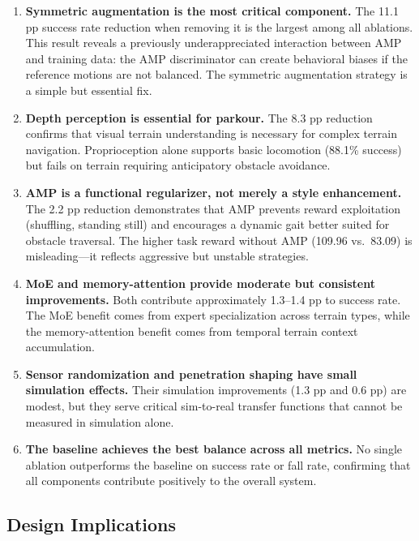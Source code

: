 \begin{enumerate}
    \item \textbf{Symmetric augmentation is the most critical component.} The 11.1 pp success rate reduction when removing it is the largest among all ablations. This result reveals a previously underappreciated interaction between AMP and training data: the AMP discriminator can create behavioral biases if the reference motions are not balanced. The symmetric augmentation strategy is a simple but essential fix.

    \item \textbf{Depth perception is essential for parkour.} The 8.3 pp reduction confirms that visual terrain understanding is necessary for complex terrain navigation. Proprioception alone supports basic locomotion (88.1\% success) but fails on terrain requiring anticipatory obstacle avoidance.

    \item \textbf{AMP is a functional regularizer, not merely a style enhancement.} The 2.2 pp reduction demonstrates that AMP prevents reward exploitation (shuffling, standing still) and encourages a dynamic gait better suited for obstacle traversal. The higher task reward without AMP (109.96 vs.\ 83.09) is misleading---it reflects aggressive but unstable strategies.

    \item \textbf{MoE and memory-attention provide moderate but consistent improvements.} Both contribute approximately 1.3--1.4 pp to success rate. The MoE benefit comes from expert specialization across terrain types, while the memory-attention benefit comes from temporal terrain context accumulation.

    \item \textbf{Sensor randomization and penetration shaping have small simulation effects.} Their simulation improvements (1.3 pp and 0.6 pp) are modest, but they serve critical sim-to-real transfer functions that cannot be measured in simulation alone.

    \item \textbf{The baseline achieves the best balance across all metrics.} No single ablation outperforms the baseline on success rate or fall rate, confirming that all components contribute positively to the overall system.
\end{enumerate}

\subsection{Design Implications}

